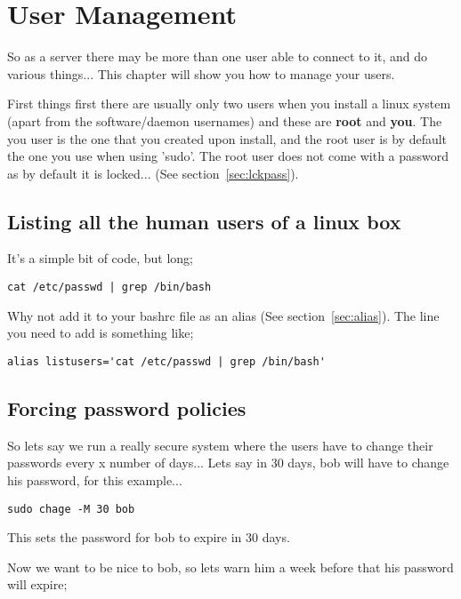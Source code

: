 \chapter{User Management}
\label{chp:user}

So as a server there may be more than one user able to connect to it, and do various things... This chapter will show you how to manage your users.

First things first there are usually only two users when you install a linux system (apart from the software/daemon usernames) and these are \textbf{root} and \textbf{you}.  The you user is the one that you created upon install, and the root user is by default the one you use when using 'sudo'.  The root user does not come with a password as by default it is locked... (See section~\ref{sec:lckpass}).

\section{Listing all the human users of a linux box}
\label{sec:listusers}

It's a simple bit of code, but long;

\begin{lstlisting}
cat /etc/passwd | grep /bin/bash
\end{lstlisting}

Why not add it to your bashrc file as an alias (See section~\ref{sec:alias}).  The line you need to add is something like;

\begin{lstlisting}
alias listusers='cat /etc/passwd | grep /bin/bash'
\end{lstlisting}

\section{Forcing password policies}

So lets say we run a really secure system where the users have to change their passwords every x number of days... Lets say in 30 days, bob will have to change his password, for this example...

\begin{lstlisting}
sudo chage -M 30 bob
\end{lstlisting}

This sets the password for bob to expire in 30 days.

Now we want to be nice to bob, so lets warn him a week before that his password will expire;

